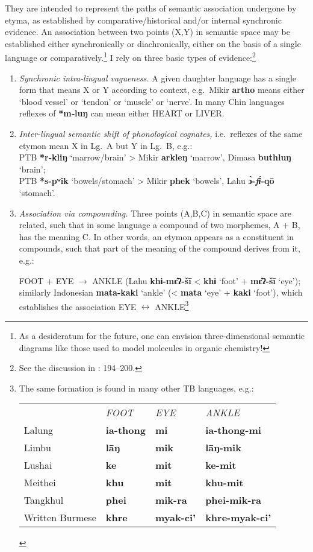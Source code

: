 They are intended to represent the paths of semantic association undergone by etyma,
as established by comparative/historical and/or internal synchronic evidence. An
association between two points (X,Y) in semantic space may be established either
synchronically or diachronically, either on the basis of a single language or
comparatively.\footnote{As a desideratum for the future, one can envision
three-dimensional semantic diagrams like those used to model molecules in
organic chemistry!}  I rely on three basic types of evidence:\footnote{See the
discussion in \citealt{VSTB}: 194–200.}
\begin{enumerate}
\item
\textit{Synchronic intra-lingual vagueness.} A given daughter language has a single
form that means X or Y according to context, e.g.\ 
Mikir \textbf{artho} means either ‘blood vessel’ or ‘tendon’ or ‘muscle’ or ‘nerve’.
In many Chin languages reflexes of \textbf{*m‑luŋ} can mean either HEART or LIVER.
\item
\textit{Inter-lingual semantic shift of phonological cognates,} i.e.\ reflexes of the
same etymon mean X in Lg.~A but Y in Lg.~B, e.g.:\\
\hspace*{2ex}PTB \textbf{*r-kliŋ} ‘marrow/brain’ > Mikir \textbf{arkleŋ} ‘marrow’, Dimasa \textbf{buthluŋ} ‘brain’;\\
\hspace*{2ex}PTB \textbf{*s-pʷik} ‘bowels/stomach’ > Mikir \textbf{phek} ‘bowels’, Lahu \textbf{ɔ̀-\textit{fɨ́}-qō} ‘stomach’.
\item
\textit{Association via compounding.}  Three points (A,B,C) in semantic space are
related, such that in some language a compound of two morphemes, A + B, has the
meaning C. In other words, an etymon appears as a constituent in compounds,
such that part of the meaning of the compound derives from it, e.g.:

FOOT + EYE $\to$ ANKLE (Lahu \textbf{khɨ-mɛ̂ʔ-šī} < \textbf{khɨ} ‘foot’ + \textbf{mɛ̂ʔ-šī} ‘eye’);
similarly Indonesian \textbf{mata-kaki} ‘ankle’ (< \textbf{mata} ‘eye’ + \textbf{kaki} ‘foot’), which
establishes the association EYE $\longleftrightarrow$ ANKLE\footnote{The same formation is
found in many other TB languages, e.g.:

\begin{tabular}{llll}
				&\textit{FOOT}	&\textit{EYE}	&\textit{ANKLE}\\
Lalung			&\textbf{ia-thong}	&\textbf{mi}	&\textbf{ia-thong-mi}\\
Limbu			&\textbf{lāŋ}	&\textbf{mik}	&\textbf{lāŋ-mik}\\
Lushai			&\textbf{ke}		&\textbf{mit}	&\textbf{ke-mit}\\
Meithei			&\textbf{khu}	&\textbf{mit}	&\textbf{khu-mit}\\
Tangkhul		&\textbf{phei}	&\textbf{mik-ra}	&\textbf{phei-mik-ra}\\
Written Burmese	&\textbf{khre}	&\textbf{myak-ci'}	&\textbf{khre-myak-ci'}\\
\end{tabular}}
\end{enumerate}

